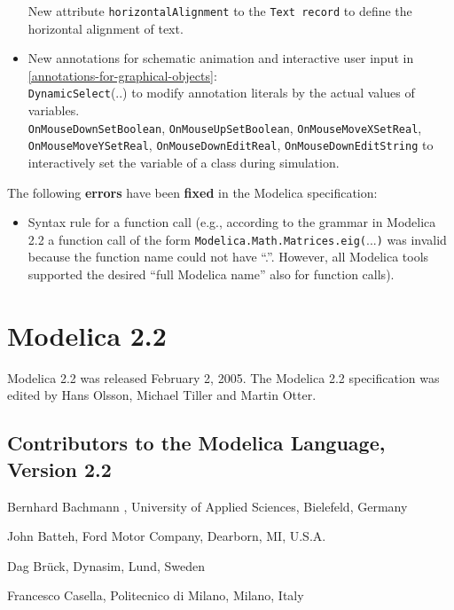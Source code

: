 \begin{itemize}
  New attribute \lstinline!horizontalAlignment! to the \lstinline!Text record! to define the
  horizontal alignment of text.
\item
  New annotations for schematic animation and interactive user input in
  \autoref{annotations-for-graphical-objects}:\\
  \lstinline!DynamicSelect!(..) to modify annotation literals by the actual values
  of variables.\\
  \lstinline!OnMouseDownSetBoolean!, \lstinline!OnMouseUpSetBoolean!, \lstinline!OnMouseMoveXSetReal!,
  \lstinline!OnMouseMoveYSetReal!, \lstinline!OnMouseDownEditReal!, \lstinline!OnMouseDownEditString! to
  interactively set the variable of a class during simulation.
\end{itemize}

The following \textbf{errors} have been \textbf{fixed} in the Modelica
specification:

\begin{itemize}
\item
  Syntax rule for a function call (e.g., according to the grammar in
  Modelica 2.2 a function call of the form
  \lstinline!Modelica.Math.Matrices.eig(!...\lstinline!)! was invalid because the function name
  could not have ``.''. However, all Modelica tools supported the
  desired ``full Modelica name'' also for function calls).
\end{itemize}

\section{Modelica 2.2}

Modelica 2.2 was released February 2, 2005. The Modelica 2.2
specification was edited by Hans Olsson, Michael Tiller and Martin
Otter.

\subsection{Contributors to the Modelica Language, Version 2.2}
\indent\indent
Bernhard Bachmann , University of Applied Sciences, Bielefeld, Germany

John Batteh, Ford Motor Company, Dearborn, MI, U.S.A.

Dag Brück, Dynasim, Lund, Sweden

Francesco Casella, Politecnico di Milano, Milano, Italy

